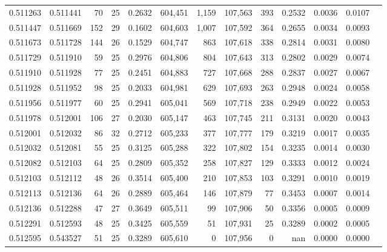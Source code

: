 \begin{tabular}{rrrrrrrrrrrrr}
0.511263 & 0.511441 &  70 &  25 &                                     0.2632 & 604,451 &   1,159 & 107,563 &     393 & 0.2532 & 0.0036 & 0.0107 \\
0.511447 & 0.511669 & 152 &  29 &                                     0.1602 & 604,603 &   1,007 & 107,592 &     364 & 0.2655 & 0.0034 & 0.0093 \\
0.511673 & 0.511728 & 144 &  26 &                                     0.1529 & 604,747 &     863 & 107,618 &     338 & 0.2814 & 0.0031 & 0.0080 \\
0.511729 & 0.511910 &  59 &  25 &                                     0.2976 & 604,806 &     804 & 107,643 &     313 & 0.2802 & 0.0029 & 0.0074 \\
0.511910 & 0.511928 &  77 &  25 &                                     0.2451 & 604,883 &     727 & 107,668 &     288 & 0.2837 & 0.0027 & 0.0067 \\
0.511928 & 0.511952 &  98 &  25 &                                     0.2033 & 604,981 &     629 & 107,693 &     263 & 0.2948 & 0.0024 & 0.0058 \\
0.511956 & 0.511977 &  60 &  25 &                                     0.2941 & 605,041 &     569 & 107,718 &     238 & 0.2949 & 0.0022 & 0.0053 \\
0.511978 & 0.512001 & 106 &  27 &                                     0.2030 & 605,147 &     463 & 107,745 &     211 & 0.3131 & 0.0020 & 0.0043 \\
0.512001 & 0.512032 &  86 &  32 &                                     0.2712 & 605,233 &     377 & 107,777 &     179 & 0.3219 & 0.0017 & 0.0035 \\
0.512032 & 0.512081 &  55 &  25 &                                     0.3125 & 605,288 &     322 & 107,802 &     154 & 0.3235 & 0.0014 & 0.0030 \\
0.512082 & 0.512103 &  64 &  25 &                                     0.2809 & 605,352 &     258 & 107,827 &     129 & 0.3333 & 0.0012 & 0.0024 \\
0.512103 & 0.512112 &  48 &  26 &                                     0.3514 & 605,400 &     210 & 107,853 &     103 & 0.3291 & 0.0010 & 0.0019 \\
0.512113 & 0.512136 &  64 &  26 &                                     0.2889 & 605,464 &     146 & 107,879 &      77 & 0.3453 & 0.0007 & 0.0014 \\
0.512136 & 0.512288 &  47 &  27 &                                     0.3649 & 605,511 &      99 & 107,906 &      50 & 0.3356 & 0.0005 & 0.0009 \\
0.512291 & 0.512593 &  48 &  25 &                                     0.3425 & 605,559 &      51 & 107,931 &      25 & 0.3289 & 0.0002 & 0.0005 \\
0.512595 & 0.543527 &  51 &  25 &                                     0.3289 & 605,610 &       0 & 107,956 &       0 &    nan & 0.0000 & 0.0000 \\
\bottomrule
\end{tabular}
